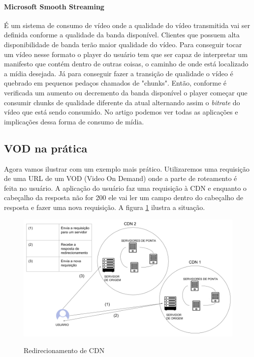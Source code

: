 \paragraph{Microsoft Smooth Streaming} \'E um sistema de consumo de v\'ideo onde a qualidade do v\'ideo transmitida vai ser definida conforme a qualidade da banda dispon\'ivel. Clientes que possuem alta disponibilidade de banda ter\~ao maior qualidade do v\'ideo. 
 Para conseguir tocar um v\'ideo nesse formato o player do usu\'ario tem que ser capaz de interpretar um manifesto que cont\'em dentro de outras coisas, o caminho de onde est\'a localizado a m\'idia desejada. 
 J\'a para conseguir fazer a transi\c{c}\~ao de qualidade o v\'ideo \'e quebrado em pequenos peda\c{c}os chamados de "chunks". Ent\~ao, conforme \'e verificada um aumento ou decremento da banda dispon\'ivel o player come\c{c}ar que consumir chunks de qualidade diferente da atual alternando assim o \textit{bitrate} do v\'ideo que est\'a sendo consumido. 
 No artigo \cite{zambelli2009iis} podemos ver todas as aplica\c{c}\~oes e implica\c{c}\~oes dessa forma de consumo de m\'idia.
\subsection{VOD na pr\'atica}
\label{subsubsection:vod_exemplo}
Agora vamos ilustrar com um exemplo mais pr\'atico. Utilizaremos uma requisi\c{c}\~ao de uma URL de um VOD (Video On Demand) onde a parte de roteamento \'e feita no usu\'ario. A aplica\c{c}\~ao do usu\'ario faz uma requisi\c{c}\~ao \`a CDN e enquanto o cabe\c{c}alho da resposta n\~ao for 200 ele vai ler um campo dentro do cabe\c{c}alho de resposta e fazer uma nova requisi\c{c}\~ao. A figura  \ref{figura:vod_redirect_exemple} ilustra a situa\c{c}\~ao.

\begin{figure}[H]
\caption{Redirecionamento de CDN}
\includegraphics[width=15cm]{Figuras/vod_redirect_exemple.png} 
\label{figura:vod_redirect_exemple}
\end{figure}